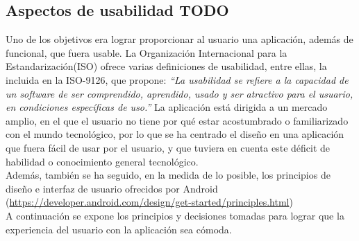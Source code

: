 \documentclass[11pt,a4paper]{report}
\begin{document}
\subsection{Aspectos de usabilidad TODO}
Uno de los objetivos era lograr proporcionar al usuario una aplicación, además de funcional, que fuera usable. La Organización Internacional para la Estandarización(ISO) ofrece varias definiciones de usabilidad, entre ellas, la incluida en la ISO-9126, que propone:
\textit{``La usabilidad se refiere a la capacidad de un software de ser comprendido, aprendido, usado y ser atractivo para el usuario, en condiciones específicas de uso.''} La aplicación está dirigida a un mercado amplio, en el que el usuario no tiene por qué estar acostumbrado o familiarizado con el mundo tecnológico, por lo que se ha centrado el diseño en una aplicación que fuera fácil de usar por el usuario, y que tuviera en cuenta este déficit de habilidad o conocimiento general tecnológico. 
\\Además, también se ha seguido, en la medida de lo posible, los principios de diseño e interfaz de usuario ofrecidos por Android (\url{https://developer.android.com/design/get-started/principles.html})
\\A continuación se expone los principios y decisiones tomadas para lograr que la experiencia del usuario con la aplicación sea cómoda.
\end{document}
